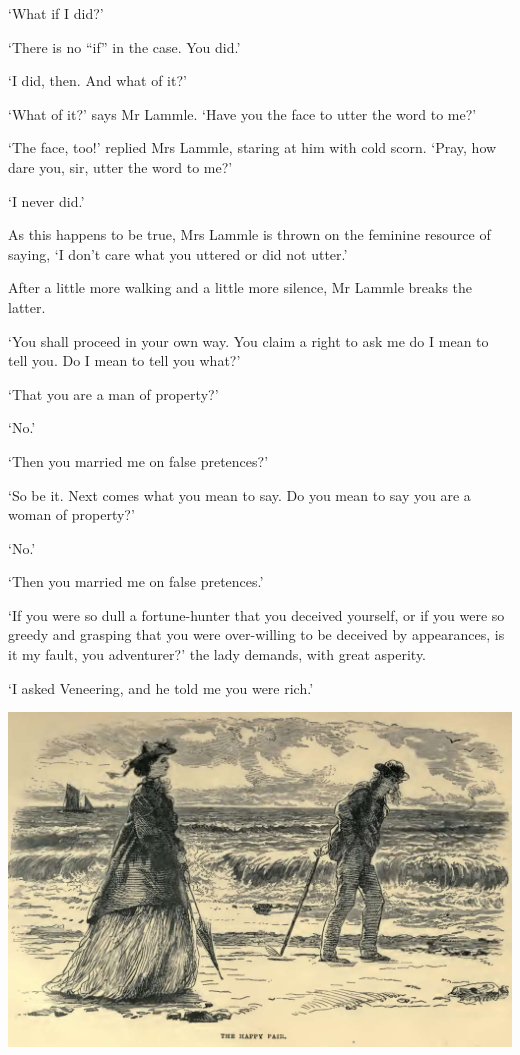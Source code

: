 ‘What if I did?’

‘There is no “if” in the case. You did.’

‘I did, then. And what of it?’

‘What of it?’ says Mr Lammle. ‘Have you the face to utter the word to
me?’

‘The face, too!’ replied Mrs Lammle, staring at him with cold scorn.
‘Pray, how dare you, sir, utter the word to me?’

‘I never did.’

As this happens to be true, Mrs Lammle is thrown on the feminine
resource of saying, ‘I don’t care what you uttered or did not utter.’

After a little more walking and a little more silence, Mr Lammle breaks
the latter.

‘You shall proceed in your own way. You claim a right to ask me do I
mean to tell you. Do I mean to tell you what?’

‘That you are a man of property?’

‘No.’

‘Then you married me on false pretences?’

‘So be it. Next comes what you mean to say. Do you mean to say you are a
woman of property?’

‘No.’

‘Then you married me on false pretences.’

‘If you were so dull a fortune-hunter that you deceived yourself, or
if you were so greedy and grasping that you were over-willing to be
deceived by appearances, is it my fault, you adventurer?’ the lady
demands, with great asperity.

‘I asked Veneering, and he told me you were rich.’

\includegraphics[scale=2.3]{01-10-01}

